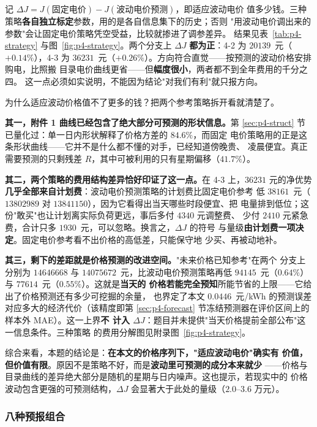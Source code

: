 记 $\Delta J=J(\text{固定电价})-J(\text{波动电价预测})$，即适应波动电价
值多少钱。三种策略\textbf{各自独立标定}参数，用的是各自信息集下的历史；否则
"用波动电价调出来的参数"会让固定电价策略凭空受益，比较就掺进了调参差异。
结果见表~\ref{tab:p4-strategy} 与图~\ref{fig:p4-strategy}。两个分支上
$\Delta J$ \textbf{都为正}：4-2 为 $20139$~元（$+0.14\%$），4-3 为
$36231$~元（$+0.26\%$）。方向符合直觉——按预测的波动价格安排购电，比照搬
目录电价曲线更省——但\textbf{幅度很小}，两者都不到全年费用的千分之四。
这一点必须如实说明，不能因为结论"对我们有利"就只报方向。

为什么适应波动价格值不了更多的钱？把两个参考策略拆开看就清楚了。

\textbf{其一，附件 1 曲线已经包含了绝大部分可预测的形状信息。}第
\ref{sec:p4-struct} 节已量化过：单一日内形状解释了价格方差的 $84.6\%$，而固定
电价策略用的正是这条形状曲线——它并不是什么都不懂的对手，已经知道傍晚贵、
凌晨便宜。真正需要预测的只剩残差 $R$，其中可被利用的只有星期偏移（$41.7\%$）。

\textbf{其二，两个策略的费用结构差异恰好印证了这一点。}在 4-3 上，$36231$
元的净优势\textbf{几乎全部来自计划费}：波动电价预测策略的计划费比固定电价参考
低 $38161$~元（$13802989$ 对 $13841150$），因为它看得出当天哪些时段便宜、把
电量排到低位；这份"敢买"也让计划离实际负荷更远，事后多付 $4340$ 元调整费、
少付 $2410$ 元紧急费，合计只多 $1930$~元，可以忽略。换言之，$\Delta J$ 的符号
与量级\textbf{由计划费一项决定}。固定电价参考看不出价格的高低差，只能保守地
少买、再被动地补。

\textbf{其三，剩下的差距就是价格预测的改进空间。}"未来价格已知参考"在两个
分支上分别为 $14646668$ 与 $14075672$~元，比波动电价预测策略再低
$94145$~元（$0.64\%$）与 $77614$~元（$0.55\%$）。这就是\textbf{当天的
价格若能完全预知}所能节省的上限——它给出了价格预测还有多少可挖掘的余量，
也界定了本文 $0.0446$~元/kWh 的预测误差对应多大的经济代价（该精度即第
\ref{sec:p4-forecast} 节冻结预测器在评价区间上的样本外 MAE）。这一上界\textbf{不
计入 $\Delta J$}：题目并未提供"当天价格提前全部公布"这一信息条件。三种策略
的费用分解图见附录图~\ref{fig:p4-strategy}。

综合来看，本题的结论是：\textbf{在本文的价格序列下，"适应波动电价"确实有
价值，但价值有限}。原因不是策略不好，而是\textbf{波动里可预测的成分本来就少}
——价格与目录曲线的差异绝大部分是随机的星期与日内噪声。这也提示，若现实中的
价格波动包含更强的可预测结构，$\Delta J$ 会显著大于此处的量级（$2.0$--$3.6$ 万元）。

\subsubsection{八种预报组合}

